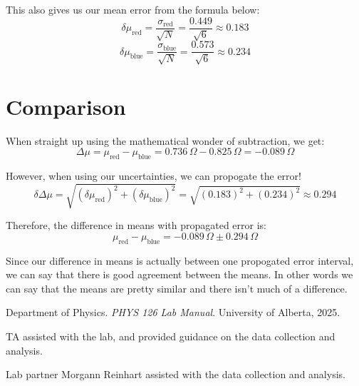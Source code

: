 \documentclass[12pt]{article}
\begin{document}
This also gives us our mean error from the formula below:
\[
\delta \mu_{\text{red}} = \frac{\sigma_{\text{red}}}{\sqrt{N}} = \frac{0.449}{\sqrt{6}} \approx 0.183
\]
\[
\delta \mu_{\text{blue}} = \frac{\sigma_{\text{blue}}}{\sqrt{N}} = \frac{0.573}{\sqrt{6}} \approx 0.234
\]

\section{Comparison}

When straight up using the mathematical wonder of subtraction, we get: 
\[
\Delta \mu = \mu_{\text{red}} - \mu_{\text{blue}} = 0.736 \, \Omega - 0.825 \, \Omega = -0.089 \, \Omega
\]

However, when using our uncertainties, we can propogate the error!
\[
\delta \Delta \mu = \sqrt{(\delta \mu_{\text{red}})^2 + (\delta \mu_{\text{blue}})^2} = \sqrt{(0.183)^2 + (0.234)^2} \approx 0.294
\]

Therefore, the difference in means with propagated error is:
\[
\mu_{\text{red}} - \mu_{\text{blue}} = -0.089 \, \Omega \pm 0.294 \, \Omega
\]

Since our difference in means is actually between one propogated error interval, we can say that there is good agreement between the means. In other words
we can say that the means are pretty similar and there isn't much of a difference.

\renewcommand{\bibname}{5\ \ \References and Acknowledgements}
\begin{thebibliography}{9}
    Department of Physics. \textit{PHYS 126 Lab Manual}. University of Alberta, 2025.

    TA assisted with the lab, and provided guidance on the data collection and analysis.

    Lab partner Morgann Reinhart assisted with the data collection and analysis.
    
\end{thebibliography}
\end{document}
